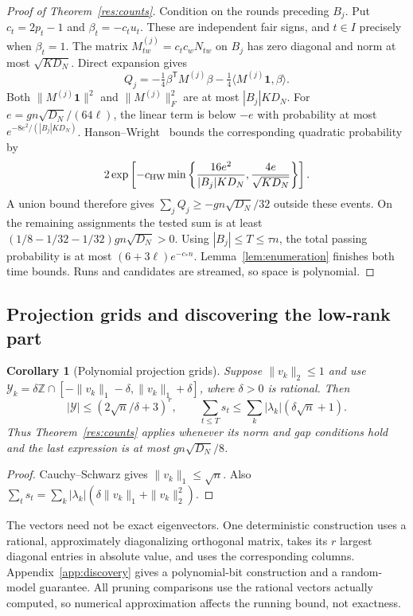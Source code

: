 \documentclass[11pt,a4paper]{article}
\newtheorem{corollary}[theorem]{Corollary}
\theoremstyle{definition}
\theoremstyle{remark}
\newcommand{\ind}{\mathbf 1}
\begin{document}
\begin{proof}[Proof of Theorem~\ref{res:counts}]
Condition on the rounds preceding $B_j$. Put $c_t=2p_t-1$ and
$\beta_t=-c_tu_t$. These are independent fair signs, and
$t\in I$ precisely when $\beta_t=1$. The matrix
$M^{(j)}_{tw}=c_tc_wN_{tw}$ on $B_j$ has zero diagonal and norm at most
$\sqrt{KD_N}$. Direct expansion gives
\[
 Q_j=-\tfrac14\beta^{\mathsf T}M^{(j)}\beta
          -\tfrac14\langle M^{(j)}\ind,\beta\rangle.
\]
Both $\|M^{(j)}\ind\|^2$ and $\|M^{(j)}\|_F^2$ are at most $|B_j|KD_N$.
For $e=gn\sqrt{D_N}/(64\ell)$, the linear term is below $-e$ with
probability at most $e^{-8e^2/(|B_j|KD_N)}$. Hanson--Wright~\cite{RV13}
bounds the corresponding quadratic probability by
\[
 2\exp\left[-c_{\rm HW}\min\left\{
       \frac{16e^2}{|B_j|KD_N},\frac{4e}{\sqrt{KD_N}}\right\}\right].
\]
A union bound therefore gives $\sum_jQ_j\ge-gn\sqrt{D_N}/32$ outside
these events. On the remaining assignments the tested sum is at least
$(1/8-1/32-1/32)gn\sqrt{D_N}>0$.
Using $|B_j|\le T\le\tau n$, the total passing probability is at most
$(6+3\ell)e^{-c_*n}$. Lemma~\ref{lem:enumeration} finishes both time
bounds. Runs and candidates are streamed, so space is polynomial.
\end{proof}

\subsection{Projection grids and discovering the low-rank part}

\begin{corollary}[Polynomial projection grids]\label{cor:spectral}
Suppose $\|v_k\|_2\le1$ and use
$\mathcal Y_k=\delta\mathbb Z\cap[-\|v_k\|_1-\delta,\|v_k\|_1+\delta]$,
where $\delta>0$ is rational. Then
\[
 |\mathcal Y|\le(2\sqrt n/\delta+3)^r,\qquad
 \sum_{t\le T}s_t\le\sum_k|\lambda_k|(\delta\sqrt n+1).
\]
Thus Theorem~\ref{res:counts} applies whenever its norm and gap conditions
hold and the last expression is at most $gn\sqrt{D_N}/8$.
\end{corollary}
\begin{proof}
Cauchy--Schwarz gives $\|v_k\|_1\le\sqrt n$. Also
$\sum_ts_t=\sum_k|\lambda_k|(\delta\|v_k\|_1+\|v_k\|_2^2)$.
\end{proof}

The vectors need not be exact eigenvectors. One deterministic construction
uses a rational, approximately diagonalizing orthogonal matrix, takes its
$r$ largest diagonal entries in absolute value, and uses the corresponding
columns. Appendix~\ref{app:discovery} gives a polynomial-bit construction
and a random-model guarantee. All pruning comparisons use the rational
vectors actually computed, so numerical approximation affects the running
bound, not exactness.
\end{document}
